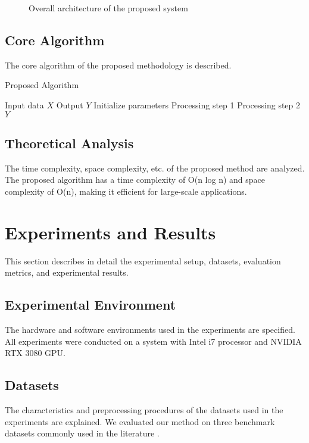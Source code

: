 \documentclass[12pt,a4paper]{article}
\begin{document}
\begin{figure}[htbp]
    \centering
    \caption{Overall architecture of the proposed system}
    \label{fig:system_overview}
\end{figure}

\subsection{Core Algorithm}
The core algorithm of the proposed methodology is described.

\begin{algorithm}
\caption{Proposed Algorithm}
\label{alg:proposed}
\begin{algorithmic}[1]
\REQUIRE Input data $X$
\ENSURE Output $Y$
\STATE Initialize parameters
    \STATE Processing step 1
    \STATE Processing step 2
\ENDFOR
\RETURN $Y$
\end{algorithmic}
\end{algorithm}

\subsection{Theoretical Analysis}
The time complexity, space complexity, etc. of the proposed method are analyzed. The proposed algorithm has a time complexity of O(n log n) and space complexity of O(n), making it efficient for large-scale applications.

\section{Experiments and Results}
\label{sec:experiments}

This section describes in detail the experimental setup, datasets, evaluation metrics, and experimental results.

\subsection{Experimental Environment}
The hardware and software environments used in the experiments are specified. All experiments were conducted on a system with Intel i7 processor and NVIDIA RTX 3080 GPU.

\subsection{Datasets}
The characteristics and preprocessing procedures of the datasets used in the experiments are explained. We evaluated our method on three benchmark datasets commonly used in the literature \cite{deng2009imagenet}.
\end{document}
